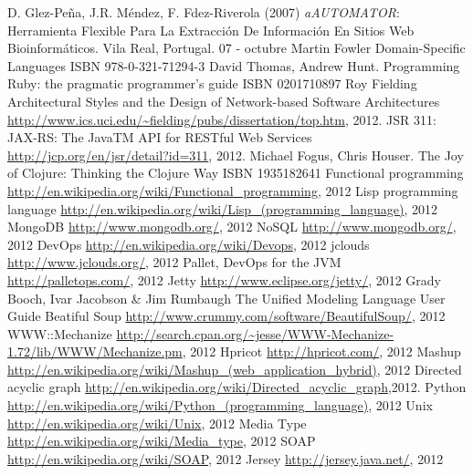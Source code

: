 \documentclass[a4paper,12pt,twoside]{report}
\begin{document}
\begin{thebibliography}{1}

  D. Glez-Peña, J.R. Méndez, F. Fdez-Riverola (2007)
  \newblock \emph{aAUTOMATOR}: Herramienta Flexible Para La
  Extracción De Información En Sitios Web Bioinformáticos. Vila Real,
  Portugal. 07 - octubre
  Martin Fowler
  \newblock Domain-Specific Languages
  \newblock ISBN 978-0-321-71294-3
  David Thomas, Andrew Hunt.
  \newblock Programming Ruby: the pragmatic programmer's guide
  \newblock ISBN 0201710897
  Roy Fielding
  \newblock Architectural Styles and
  the Design of Network-based Software Architectures
  \newblock
  \url{http://www.ics.uci.edu/~fielding/pubs/dissertation/top.htm},
  2012.
  \newblock JSR 311: JAX-RS: The JavaTM API for RESTful Web Services
  \newblock \url{http://jcp.org/en/jsr/detail?id=311}, 2012.
  Michael Fogus, Chris Houser.
  \newblock The Joy of Clojure: Thinking the Clojure Way
  \newblock ISBN 1935182641
  \newblock Functional programming
  \newblock \url{http://en.wikipedia.org/wiki/Functional_programming}, 2012
  \newblock Lisp programming language
  \newblock \url{http://en.wikipedia.org/wiki/Lisp_(programming_language)}, 2012
  \newblock MongoDB
  \newblock \url{http://www.mongodb.org/}, 2012
  \newblock NoSQL
  \newblock \url{http://www.mongodb.org/}, 2012
  \newblock DevOps
  \url{http://en.wikipedia.org/wiki/Devops}, 2012
  \newblock jclouds
  \newblock \url{http://www.jclouds.org/}, 2012
  \newblock Pallet, DevOps for the JVM
  \newblock \url{http://palletops.com/}, 2012
  \newblock Jetty
  \newblock \url{http://www.eclipse.org/jetty/}, 2012
  Grady Booch, Ivar Jacobson \& Jim Rumbaugh
  \newblock The Unified Modeling Language User Guide
  \newblock Beatiful Soup
  \newblock \url{http://www.crummy.com/software/BeautifulSoup/}, 2012
  \newblock WWW::Mechanize
  \newblock
  \url{http://search.cpan.org/~jesse/WWW-Mechanize-1.72/lib/WWW/Mechanize.pm},
  2012
  \newblock Hpricot
  \newblock \url{http://hpricot.com/}, 2012
  \newblock Mashup
  \newblock \url{http://en.wikipedia.org/wiki/Mashup_(web_application_hybrid)}, 2012
  \newblock Directed acyclic graph
  \newblock \url{http://en.wikipedia.org/wiki/Directed_acyclic_graph},2012.
  \newblock Python
  \newblock
  \url{http://en.wikipedia.org/wiki/Python_(programming_language)}, 2012
  \newblock Unix
  \newblock \url{http://en.wikipedia.org/wiki/Unix}, 2012
  \newblock Media Type
  \newblock \url{http://en.wikipedia.org/wiki/Media_type}, 2012
  \newblock SOAP
  \newblock \url{http://en.wikipedia.org/wiki/SOAP}, 2012
  \newblock Jersey
  \newblock \url{http://jersey.java.net/}, 2012


\end{thebibliography}
\end{document}

